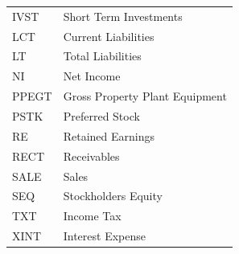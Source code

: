 \documentclass[conference]{IEEEtran}
\begin{document}
\begin{table}[htbp]
\begin{tabular}{@{}p{3.4cm}p{5cm}@{}}
\hspace{5mm}IVST & Short Term Investments\hspace{5mm} \\
\hspace{5mm}LCT & Current Liabilities\hspace{5mm} \\
\hspace{5mm}LT & Total Liabilities\hspace{5mm} \\
\hspace{5mm}NI & Net Income\hspace{5mm} \\
\hspace{5mm}PPEGT & Gross Property Plant Equipment\hspace{5mm} \\
\hspace{5mm}PSTK & Preferred Stock\hspace{5mm} \\
\hspace{5mm}RE & Retained Earnings\hspace{5mm} \\
\hspace{5mm}RECT & Receivables\hspace{5mm} \\
\hspace{5mm}SALE & Sales\hspace{5mm} \\
\hspace{5mm}SEQ & Stockholders Equity\hspace{5mm} \\
\hspace{5mm}TXT & Income Tax\hspace{5mm} \\
\hspace{5mm}XINT & Interest Expense\hspace{5mm} \\
\bottomrule
\end{tabular}
\label{tab1}
\end{table}
\end{document}
